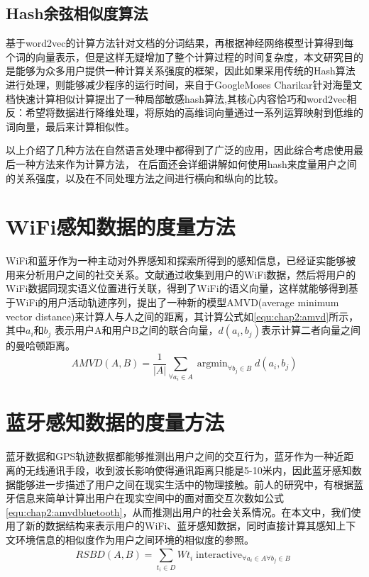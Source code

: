 \subsection{Hash余弦相似度算法}
基于word2vec的计算方法针对文档的分词结果，再根据神经网络模型计算得到每个词的向量表示，但是这样无疑增加了整个计算过程的时间复杂度，本文研究目的是能够为众多用户提供一种计算关系强度的框架，因此如果采用传统的Hash算法进行处理，则能够减少程序的运行时间，来自于GoogleMoses Charikar针对海量文档快速计算相似计算提出了一种局部敏感hash算法,其核心内容恰巧和word2vec相反：希望将数据进行降维处理，将原始的高维词向量通过一系列运算映射到低维的词向量，最后来计算相似性。
\par 以上介绍了几种方法在自然语言处理中都得到了广泛的应用，因此综合考虑使用最后一种方法来作为计算方法， 在后面还会详细讲解如何使用hash来度量用户之间的关系强度，以及在不同处理方法之间进行横向和纵向的比较。
\section{WiFi感知数据的度量方法}
WiFi和蓝牙作为一种主动对外界感知和探索所得到的感知信息，已经证实能够被用来分析用户之间的社交关系。文献\cite{hsu2007mining}通过收集到用户的WiFi数据，然后将用户的WiFi数据同现实语义位置进行关联，得到了WiFi的语义向量，这样就能够得到基于WiFi的用户活动轨迹序列，提出了一种新的模型AMVD(average minimum vector distance)来计算人与人之间的距离，其计算公式如\ref{equ:chap2:amvd}所示，其中$a_{i}$和$b_{j}$ 表示用户A和用户B之间的联合向量，$d(a_{i},b_{j})$表示计算二者向量之间的曼哈顿距离。
\begin{equation}
\label{equ:chap2:amvd}
AMVD(A,B)=\frac{1}{\left | A \right |}\sum_{\forall a_{i} \in A}^{ }  \mathop{\arg\min}_{\forall b_{j} \in B} d(a_{i},b_{j})
\end{equation}
\section{蓝牙感知数据的度量方法}
蓝牙数据和GPS轨迹数据都能够推测出用户之间的交互行为，蓝牙作为一种近距离的无线通讯手段，收到波长影响使得通讯距离只能是5-10米内，因此蓝牙感知数据能够进一步描述了用户之间在现实生活中的物理接触。前人的研究中，有根据蓝牙信息来简单计算出用户在现实空间中的面对面交互次数如公式\ref{equ:chap2:amvdbluetooth}，从而推测出用户的社会关系情况。在本文中，我们使用了新的数据结构来表示用户的WiFi、蓝牙感知数据，同时直接计算其感知上下文环境信息的相似度作为用户之间环境的相似度的参照。
\begin{equation}
\label{equ:chap2:amvdbluetooth}
RSBD(A,B)=\sum_{t_{i} \in D}^{ } Wt_{i} \mathop{interactive(a_{i},b_{j})}_{\forall a_{i} \in A \forall b_{j} \in B}
\end{equation}

